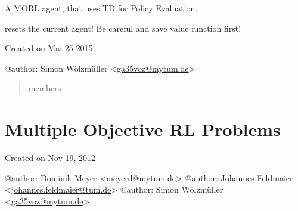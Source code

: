\documentclass[letterpaper,10pt,english]{sphinxmanual}
\begin{document}

\begin{fulllineitems}
\label{Agents:morl_agents.TDMorlAgent}
A MORL agent, that uses TD for Policy Evaluation.

\begin{fulllineitems}
\label{Agents:morl_agents.TDMorlAgent.reset}
resets the current agent! Be careful and save value function first!

\end{fulllineitems}


\end{fulllineitems}

\label{Agents:module-morl_agents_multiple_criteria}
Created on Mai 25 2015

@author: Simon Wölzmüller \textless{}\href{mailto:ga35voz@mytum.de}{ga35voz@mytum.de}\textgreater{}
\begin{quote}\begin{description}
\item[{members}] \leavevmode
\end{description}\end{quote}


\chapter{Multiple Objective RL Problems}
\label{Problems:multiple-objective-rl-problems}\label{Problems::doc}\label{Problems:module-morl_problems}
Created on Nov 19, 2012

@author: Dominik Meyer \textless{}\href{mailto:meyerd@mytum.de}{meyerd@mytum.de}\textgreater{}
@author: Johannes Feldmaier \textless{}\href{mailto:johannes.feldmaier@tum.de}{johannes.feldmaier@tum.de}\textgreater{}
@author: Simon Wölzmüller   \textless{}\href{mailto:ga35voz@mytum.de}{ga35voz@mytum.de}\textgreater{}
\end{document}
